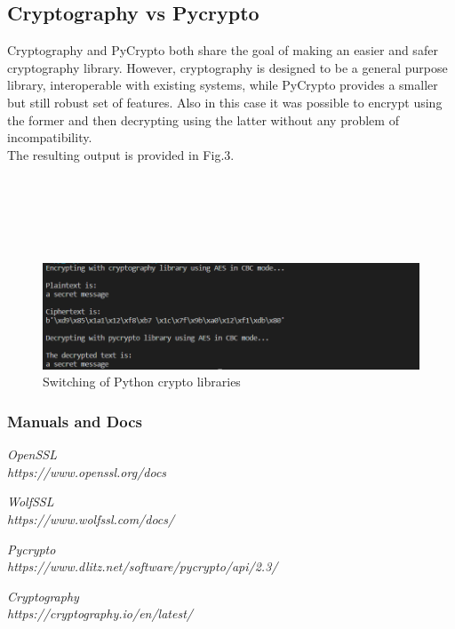 \documentclass[11 pt]{article}
\begin{document}
\subsection{Cryptography vs Pycrypto}
Cryptography and PyCrypto both share the goal of making an easier and safer cryptography library. However, cryptography is designed to be a general purpose library, interoperable with existing systems, while PyCrypto provides a smaller but still robust set of features.
Also in this case it was possible to encrypt using the former and then decrypting using the latter without any problem of incompatibility.\\
The resulting output is provided in Fig.3.\\\\\\\\\\\\

\begin{figure}[!t]
	\includegraphics[width=1\textwidth]{py_output-hw4-1743261.png}
	\caption{Switching of Python crypto libraries}
\end{figure}

\begin{thebibliography}{10}

	\subsubsection*{Manuals and Docs}
	\textsl{OpenSSL} \\
	\textit{https://www.openssl.org/docs}
	
	\textsl{WolfSSL} \\
	\textit{https://www.wolfssl.com/docs/}
	
	\textsl{Pycrypto} \\
	\textit{https://www.dlitz.net/software/pycrypto/api/2.3/}
	
	\textsl{Cryptography} \\
	\textit{https://cryptography.io/en/latest/}
	
\end{thebibliography}
\end{document}
